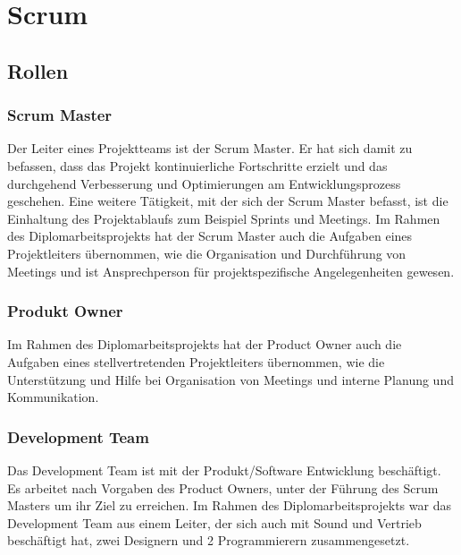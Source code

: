 
\section{Scrum}\label{sec:scrum}

\renewcommand{\kapitelautor}{Autor: Nils} %

\subsection{Rollen}\label{subsec:rollen}

%
\subsubsection{Scrum Master}\label{subsubsec:Scrum-Master}
%
Der Leiter eines Projektteams ist der Scrum Master. Er hat sich damit zu befassen, dass das Projekt kontinuierliche Fortschritte erzielt und das durchgehend Verbesserung und Optimierungen am Entwicklungsprozess geschehen.
Eine weitere Tätigkeit, mit der sich der Scrum Master befasst, ist die Einhaltung des Projektablaufs zum Beispiel Sprints und Meetings.\cite{AsanaScrumMaster}
Im Rahmen des Diplomarbeitsprojekts hat der Scrum Master auch die Aufgaben eines Projektleiters übernommen, wie die Organisation und Durchführung von Meetings und ist Ansprechperson für projektspezifische Angelegenheiten gewesen.
%
\subsubsection{Produkt Owner}\label{subsubsec:Product-Owner}
%
\cite{AsanaProductOwner}

Im Rahmen des Diplomarbeitsprojekts hat der Product Owner auch die Aufgaben eines stellvertretenden Projektleiters übernommen, wie die Unterstützung und Hilfe bei Organisation von Meetings und interne Planung und Kommunikation.
%
\subsubsection{Development Team}\label{subsubsec:Development-Team}
%
Das Development Team ist mit der Produkt/Software Entwicklung beschäftigt. Es arbeitet nach Vorgaben des Product Owners, unter der Führung des Scrum Masters um ihr Ziel zu erreichen.
Im Rahmen des Diplomarbeitsprojekts war das Development Team aus einem Leiter, der sich auch mit Sound und Vertrieb beschäftigt hat, zwei Designern und 2 Programmierern zusammengesetzt.
%
